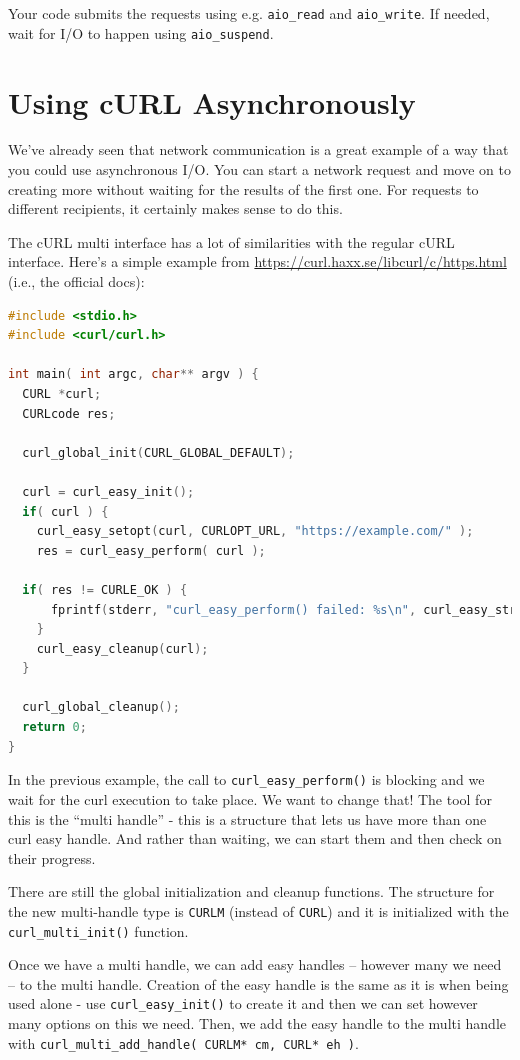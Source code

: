 \documentclass[a4paper]{report}
\begin{document}
Your code submits the requests using e.g. {\tt aio\_read} and {\tt aio\_write}.
If needed, wait for I/O to happen using {\tt aio\_suspend}.

\section*{Using cURL Asynchronously}
We've already seen that network communication is a great example of a way that you could use asynchronous  I/O. You can start a network request and move on to creating more without waiting for the results of the first one. For requests to different recipients, it certainly makes sense to do this.

The cURL multi interface has a lot of similarities with the regular cURL interface. Here's a simple example from \url{https://curl.haxx.se/libcurl/c/https.html} (i.e., the official docs):

\begin{lstlisting}[language=C]
#include <stdio.h>
#include <curl/curl.h>
 
int main( int argc, char** argv ) {
  CURL *curl;
  CURLcode res;
 
  curl_global_init(CURL_GLOBAL_DEFAULT);
 
  curl = curl_easy_init();
  if( curl ) {
    curl_easy_setopt(curl, CURLOPT_URL, "https://example.com/" );
    res = curl_easy_perform( curl );
    
  if( res != CURLE_OK ) {
      fprintf(stderr, "curl_easy_perform() failed: %s\n", curl_easy_strerror(res));
    }
    curl_easy_cleanup(curl);
  }
 
  curl_global_cleanup();
  return 0;
}
\end{lstlisting}

In the previous example, the call to \texttt{curl\_easy\_perform()} is blocking and we wait for the curl execution to take place. We want to change that! The tool for this is the ``multi handle'' - this is a structure that lets us have more than one curl easy handle. And rather than waiting, we can start them and then check on their progress. 

There are still the global initialization and cleanup functions. The structure for the new multi-handle type is \texttt{CURLM} (instead of \texttt{CURL}) and it is initialized with the \texttt{curl\_multi\_init()} function. 

Once we have a multi handle, we can add easy handles -- however many we need -- to the multi handle. Creation of the easy handle is the same as it is when being used alone - use \texttt{curl\_easy\_init()} to create it and then we can set however many options on this we need. Then, we add the easy handle to the multi handle with \texttt{curl\_multi\_add\_handle( CURLM* cm, CURL* eh )}.
\end{document}
